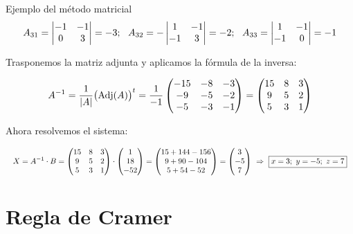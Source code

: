 \documentclass[11pt,a4paper]{article}
\newcommand{\fmdisp}[1]{\[\setbox2=\hbox{$\displaystyle #1$}\ifdim\wd2>\linewidth\resizebox{\linewidth}{!}{\box2}\else\box2\fi\]}
\begin{document}
\begin{fmex}{Ejemplo del método matricial}
\fmdisp{A_{31}=\begin{vmatrix}-1 & -1\\ 0 & 3\end{vmatrix}=-3;\ \ A_{32}=-\begin{vmatrix}1 & -1\\ -1 & 3\end{vmatrix}=-2;\ \ A_{33}=\begin{vmatrix}1 & -1\\ -1 & 0\end{vmatrix}=-1}

Trasponemos la matriz adjunta y aplicamos la fórmula de la inversa:

\fmdisp{A^{-1}=\frac{1}{|A|}\big(\mathrm{Adj}(A)\big)^t=\frac{1}{-1}\begin{pmatrix}-15 & -8 & -3\\ -9 & -5 & -2\\ -5 & -3 & -1\end{pmatrix}=\begin{pmatrix}15 & 8 & 3\\ 9 & 5 & 2\\ 5 & 3 & 1\end{pmatrix}}

Ahora resolvemos el sistema:

\fmdisp{X=A^{-1}\cdot B=\begin{pmatrix}15 & 8 & 3\\ 9 & 5 & 2\\ 5 & 3 & 1\end{pmatrix}\cdot\begin{pmatrix}1\\ 18\\ -52\end{pmatrix}=\begin{pmatrix}15+144-156\\ 9+90-104\\ 5+54-52\end{pmatrix}=\begin{pmatrix}3\\ -5\\ 7\end{pmatrix}\ \Rightarrow\ \boxed{x=3;\ y=-5;\ z=7}}

\end{fmex}

\section{Regla de Cramer}\hypertarget{sec3}{}
\end{document}
